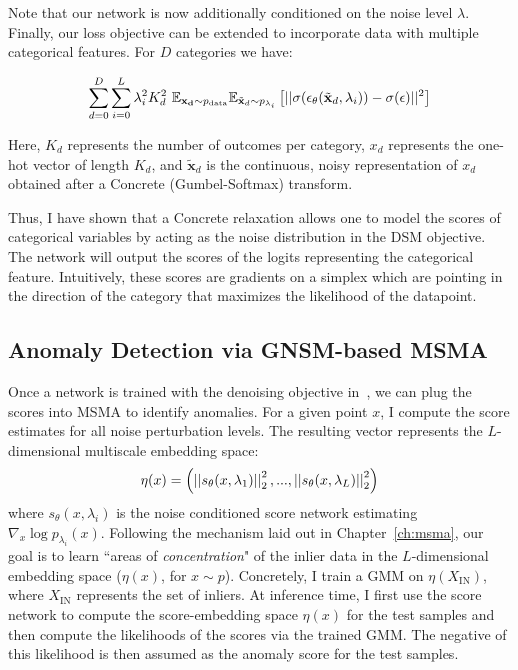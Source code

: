 Note that our network is now additionally conditioned on the noise level $\lambda$. Finally, our loss objective can be extended to incorporate data with multiple categorical features. For $D$ categories we have:

\begin{equation}
\label{eq:ncsn_obj}
    \sum_{d=0}^{D} \sum_{i=0}^{L} \lambda_i^2 K_d^2 ~\mathbb{E}_{\mathbf{x_d} \sim p_{\text{data}}} \mathbb{E}_{\Tilde{\mathbf{x}}_d \sim p_{\lambda_i}} \left[ { || \sigma( \epsilon_\theta(\tilde{\mathbf{x}}_d,  \lambda_i) ) - \sigma(\epsilon)||^2 } \right]
\end{equation}

Here, $K_d$ represents the number of outcomes per category, $x_d$ represents the one-hot vector of length $K_d$, and  $\tilde{\mathbf{x}}_d$ is the continuous, noisy representation of $x_d$ obtained after a Concrete (Gumbel-Softmax) transform.

Thus, I have shown that a Concrete relaxation allows one to model the scores of categorical variables by acting as the noise distribution in the DSM objective. The network will output the scores of the logits representing the categorical feature. Intuitively, these scores are gradients on a simplex which are pointing in the direction of the category that maximizes the likelihood of the datapoint.

\subsection*{Anomaly Detection via GNSM-based MSMA}
Once a network is trained with the denoising objective in~, we can plug the scores into MSMA to identify anomalies. For a given point $x$, I compute the score estimates for all noise perturbation levels. The resulting vector represents the $L$-dimensional multiscale embedding space:
\begin{equation}\label{eq:norms}
    \eta(x) = \left( \left|\left| {  s_\theta(x, \lambda_1) } \right|\right|_2^2, ... , \left|\left| {  s_\theta(x, \lambda_L) } \right|\right|_2^2 \right)
\end{equation}
where $s_\theta(x, \lambda_i)$ is the noise conditioned score network estimating $\nabla_{x} \log p_{\lambda_i}(x)$.
Following the mechanism laid out in Chapter~\ref{ch:msma}, our goal is to learn ``areas of \emph{concentration}" of the inlier data in the $L$-dimensional embedding space ($\eta(x)$, for $x\sim p$). Concretely, I train a GMM on $\eta(X_{\text{IN}})$, where $X_{\text{IN}}$ represents the set of inliers. At inference time, I first use the score network to compute the score-embedding space $\eta(x)$ for the test samples and then compute the likelihoods of the scores via the trained GMM. The negative of this likelihood is then assumed as the anomaly score for the test samples.

